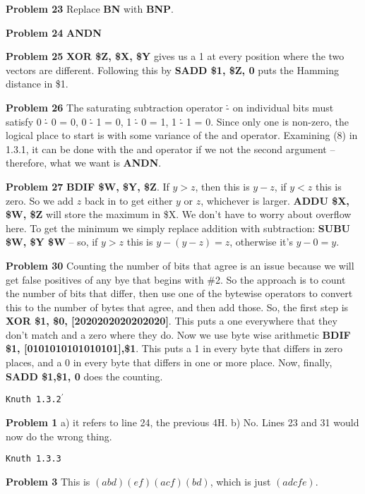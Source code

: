 \vskip 0.1in
\noindent
{\bf Problem 23} Replace {\bf BN} with {\bf BNP}.

\vskip 0.1in
\noindent
{\bf Problem 24} {\bf ANDN}

\vskip 0.1in
\noindent
{\bf Problem 25} {\bf XOR \$Z, \$X, \$Y} gives us a 1 at every
position where the two vectors are different.  Following this 
by {\bf SADD \$1, \$Z, 0} puts the Hamming distance in \$1.

\vskip 0.1in
\noindent
{\bf Problem 26} The saturating subtraction operator \.{-} on 
individual bits must satisfy 0 \.{-} 0 = 0, 0 \.{-} 1 = 0, 1 \.{-} 0 = 1,
1 \.{-} 1 = 0.  Since only one is non-zero, the logical place
to start is with some variance of the and operator.  Examining
(8) in 1.3.1, it can be done with the and operator if we not
the second argument -- therefore, what we want is {\bf ANDN}.

\vskip 0.1in
\noindent
{\bf Problem 27} {\bf BDIF \$W, \$Y, \$Z}.  If $y > z$, then this is
$y-z$, if $y < z$ this is zero.  So we add $z$ back in to get
either $y$ or $z$, whichever is larger. {\bf ADDU \$X, \$W, \$Z}
will store the maximum in \$X.  We don't have to worry about overflow
here.  To get the minimum we simply replace addition with subtraction:
{\bf SUBU \$W, \$Y \$W} -- so, if $y>z$ this is $y-\left(y-z\right)=z$, otherwise
it's $y-0=y$.

\vskip 0.1in
\noindent
{\bf Problem 30} Counting the number of bits that agree is an issue
because we will get false positives of any bye that begins with \#2.
So the approach is to count the number of bits that differ, then use
one of the bytewise operators to convert this to the number of bytes
that agree, and then add those.  So, the first step is 
 {\bf XOR \$1, \$0, [2020202020202020]}.  This puts a one
everywhere that they don't match and a zero where they do.  
Now we use byte wise arithmetic {\bf BDIF \$1, [0101010101010101],\$1}.
This puts a 1 in every byte that differs in zero places, and a 0 in every
byte that differs in one or more place.  Now, finally, {\bf SADD \$1,\$1, 0}
does the counting.

\vskip 0.5in
\centerline{ \tt Knuth 1.3.2$^{\prime}$ }
\vskip 0.5in

\noindent
{\bf Problem 1} a) it refers to line 24, the previous 4H. b)  No.  Lines 23 and 31 would now do the wrong thing.

\vskip 0.5in
\centerline{\tt Knuth 1.3.3}
\vskip 0.5in

\noindent
{\bf Problem 3} This is $\left(a b d\right)\left(e f\right) \left(a c f\right) \left(b d\right)$,
which is just $\left(a d c f e\right)$.

